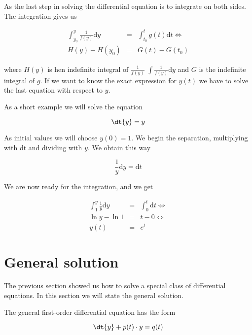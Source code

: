As the last step in solving the differential equation is to integrate on both sides. The integration gives us

\begin{eqnarray}
  \int_{y_0}^{y} \frac{1}{f(y)}\mathrm{d}y &=& \int_{t_0}^t g(t)\mathrm{d}t \Leftrightarrow \\
  H(y) - H(y_0) &=& G(t) - G(t_0)
\end{eqnarray}

where $H(y)$ is hen indefinite integral of $\frac{1}{f(y)}$ \ie $\int \frac{1}{f(y)} \mathrm{d}y$ and $G$ is the indefinite integral of $g$. If we want to know the exact expression for $y(t)$ we have to solve the last equation with respect to $y$.

\begin{example}
  As a short example we will solve the equation

  \begin{equation}
    \dt{y} = y
  \end{equation}

  As initial values we will choose $y(0) = 1$. We begin the separation, multiplying with dt and dividing with $y$. We obtain this way

  \begin{equation}
    \frac{1}{y} \mathrm{d}y = \mathrm{d}t
  \end{equation}

  We are now ready for the integration, and we get

  \begin{eqnarray}
    \int_1^y \frac{1}{y} \mathrm{d}y &=& \int_0^t \mathrm{d}t \Leftrightarrow \\ \nonumber
    \ln y - \ln 1 &=& t - 0 \Leftrightarrow \\ \nonumber
    y(t) &=& e^t
  \end{eqnarray}
\end{example}

\section{General solution}
\label{sect:ode:general}

The previous section showed us how to solve a special class of differential equations. In this section we will state the general solution.

The general first-order differential equation has the form

\begin{equation}
  \dt{y} + p(t) \cdot y = q(t)
\end{equation}

